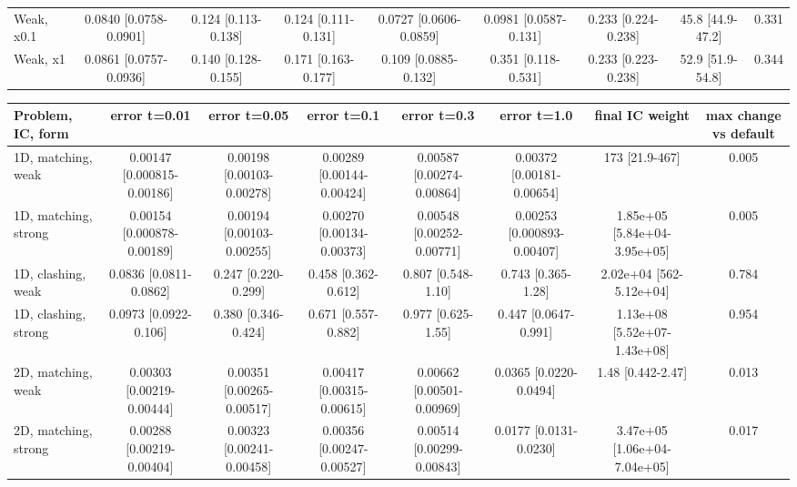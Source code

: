 \begin{tabular}{lcccccccc}
Weak, x0.1 & 0.0840 {\scriptsize[0.0758-0.0901]} & 0.124 {\scriptsize[0.113-0.138]} & 0.124 {\scriptsize[0.111-0.131]} & 0.0727 {\scriptsize[0.0606-0.0859]} & 0.0981 {\scriptsize[0.0587-0.131]} & 0.233 {\scriptsize[0.224-0.238]} & 45.8 {\scriptsize[44.9-47.2]} & 0.331 \\
Weak, x1 & 0.0861 {\scriptsize[0.0757-0.0936]} & 0.140 {\scriptsize[0.128-0.155]} & 0.171 {\scriptsize[0.163-0.177]} & 0.109 {\scriptsize[0.0885-0.132]} & 0.351 {\scriptsize[0.118-0.531]} & 0.233 {\scriptsize[0.223-0.238]} & 52.9 {\scriptsize[51.9-54.8]} & 0.344 \\
\bottomrule
\end{tabular}

\begin{tabular}{lccccccc}
\toprule
Problem, IC, form & error t=0.01 & error t=0.05 & error t=0.1 & error t=0.3 & error t=1.0 & final IC weight & max change vs default \\
\midrule
1D, matching, weak & 0.00147 {\scriptsize[0.000815-0.00186]} & 0.00198 {\scriptsize[0.00103-0.00278]} & 0.00289 {\scriptsize[0.00144-0.00424]} & 0.00587 {\scriptsize[0.00274-0.00864]} & 0.00372 {\scriptsize[0.00181-0.00654]} & 173 {\scriptsize[21.9-467]} & 0.005 \\
1D, matching, strong & 0.00154 {\scriptsize[0.000878-0.00189]} & 0.00194 {\scriptsize[0.00103-0.00255]} & 0.00270 {\scriptsize[0.00134-0.00373]} & 0.00548 {\scriptsize[0.00252-0.00771]} & 0.00253 {\scriptsize[0.000893-0.00407]} & 1.85e+05 {\scriptsize[5.84e+04-3.95e+05]} & 0.005 \\
1D, clashing, weak & 0.0836 {\scriptsize[0.0811-0.0862]} & 0.247 {\scriptsize[0.220-0.299]} & 0.458 {\scriptsize[0.362-0.612]} & 0.807 {\scriptsize[0.548-1.10]} & 0.743 {\scriptsize[0.365-1.28]} & 2.02e+04 {\scriptsize[562-5.12e+04]} & 0.784 \\
1D, clashing, strong & 0.0973 {\scriptsize[0.0922-0.106]} & 0.380 {\scriptsize[0.346-0.424]} & 0.671 {\scriptsize[0.557-0.882]} & 0.977 {\scriptsize[0.625-1.55]} & 0.447 {\scriptsize[0.0647-0.991]} & 1.13e+08 {\scriptsize[5.52e+07-1.43e+08]} & 0.954 \\
2D, matching, weak & 0.00303 {\scriptsize[0.00219-0.00444]} & 0.00351 {\scriptsize[0.00265-0.00517]} & 0.00417 {\scriptsize[0.00315-0.00615]} & 0.00662 {\scriptsize[0.00501-0.00969]} & 0.0365 {\scriptsize[0.0220-0.0494]} & 1.48 {\scriptsize[0.442-2.47]} & 0.013 \\
2D, matching, strong & 0.00288 {\scriptsize[0.00219-0.00404]} & 0.00323 {\scriptsize[0.00241-0.00458]} & 0.00356 {\scriptsize[0.00247-0.00527]} & 0.00514 {\scriptsize[0.00299-0.00843]} & 0.0177 {\scriptsize[0.0131-0.0230]} & 3.47e+05 {\scriptsize[1.06e+04-7.04e+05]} & 0.017 \\

\end{tabular}
